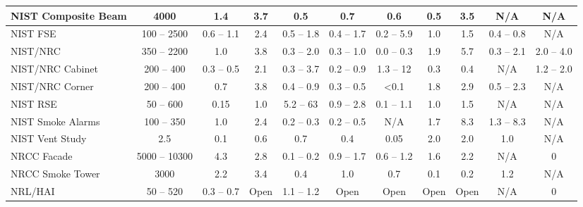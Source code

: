 \begin{landscape}
\begin{longtable}{|l|c|c|c|c|c|c|c|c|c|c|}
NIST Composite Beam & 4000          & 1.4           & 3.7   & 0.5               & 0.7                 & 0.6           & 0.5         & 3.5         & N/A                   & N/A                   \\ \hline
NIST FSE            & 100 -- 2500   & 0.6 -- 1.1    & 2.4   & 0.5 -- 1.8        & 0.4 -- 1.7          & 0.2 -- 5.9    & 1.0         & 1.5         & 0.4 -- 0.8            & N/A                   \\ \hline
NIST/NRC            & 350 -- 2200   & 1.0           & 3.8   & 0.3 -- 2.0        & 0.3 -- 1.0          & 0.0 -- 0.3    & 1.9         & 5.7         & 0.3 -- 2.1            & 2.0 -- 4.0            \\ \hline
NIST/NRC Cabinet    & 200 -- 400    & 0.3 -- 0.5    & 2.1   & 0.3 -- 3.7        & 0.2 -- 0.9          & 1.3 -- 12     & 0.3         & 0.4         & N/A                   & 1.2 -- 2.0            \\ \hline
NIST/NRC Corner     & 200 -- 400    & 0.7           & 3.8   & 0.4 -- 0.9        & 0.3 -- 0.5          & <0.1          & 1.8         & 2.9         & 0.5 -- 2.3            & N/A                   \\ \hline
NIST RSE            & 50 -- 600     & 0.15          & 1.0   & 5.2 -- 63         & 0.9 -- 2.8          & 0.1 -- 1.1    & 1.0         & 1.5         & N/A                   & N/A                   \\ \hline
NIST Smoke Alarms   & 100 -- 350    & 1.0           & 2.4   & 0.2 -- 0.3        & 0.2 -- 0.5          & N/A           & 1.7         & 8.3         & 1.3 -- 8.3            & N/A                   \\ \hline
NIST Vent Study     & 2.5           & 0.1           & 0.6   & 0.7               & 0.4                 & 0.05          & 2.0         & 2.0         & 1.0                   & N/A                   \\ \hline
NRCC Facade         & 5000 -- 10300 & 4.3           & 2.8   & 0.1 -- 0.2        & 0.9 -- 1.7          & 0.6 -- 1.2    & 1.6         & 2.2         & N/A                   & 0                     \\ \hline
NRCC Smoke Tower    & 3000          & 2.2           & 3.4   & 0.4               & 1.0                 & 0.7           & 0.1         & 0.2         & 1.2                   & N/A                   \\ \hline
NRL/HAI             & 50 -- 520     & 0.3 -- 0.7    & Open  & 1.1 -- 1.2        & Open                & Open          & Open        & Open        & N/A                   & 0                     \\ \hline

\end{longtable}
\end{landscape}
